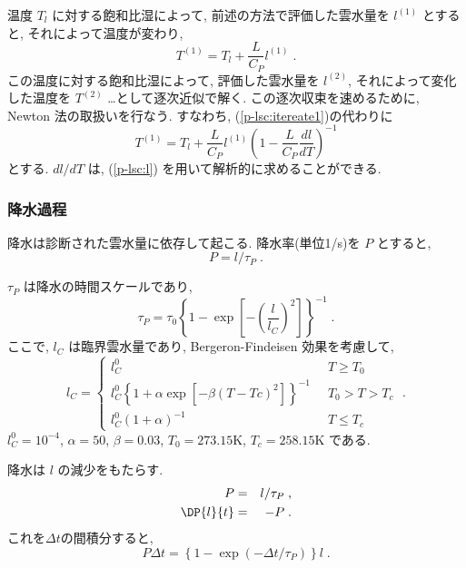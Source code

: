温度 $T_l$ に対する飽和比湿によって, 
前述の方法で評価した雲水量を $l^{(1)}$ とすると,
それによって温度が変わり,
\begin{equation}
  T^{(1)} = T_l +  \frac{L}{C_P} l^{(1)} \; .
  \label{p-lsc:itereate1}
\end{equation}
この温度に対する飽和比湿によって, 評価した雲水量を $l^{(2)}$,
それによって変化した温度を $T^{(2)}$ \ldots として逐次近似で解く.
この逐次収束を速めるために, Newton 法の取扱いを行なう.
すなわち, (\ref{p-lsc:itereate1})の代わりに
\begin{equation}
  T^{(1)} = T_l +  \frac{L}{C_P} l^{(1)} 
                   \left( 1 - \frac{L}{C_P} \frac{dl}{dT} \right)^{-1}
\end{equation}
とする.
$dl/dT$ は, (\ref{p-lsc:l}) を用いて解析的に求めることができる.

\subsubsection{降水過程}

降水は診断された雲水量に依存して起こる.
降水率(単位1/s)を $P$ とすると,
\begin{equation}
  P = l / \tau_P \; .
\end{equation}

$\tau_P$ は降水の時間スケールであり,
\begin{equation}
  \tau_P  = \tau_0 \left\{ 1 - \exp\left[ - \left(\frac{l}{l_C}\right)^2  
                                   \right]  \right\}^{-1} \; .
\end{equation}
ここで, $l_C$ は臨界雲水量であり,
Bergeron-Findeisen 効果を考慮して,
\begin{equation}
  l_C = \left\{ 
        \begin{array}{ll}
          l_C^0 \; \; & T \ge T_0 \\
          l_C^0 \left\{ 1+\alpha \exp\left[ - \beta(T-Tc)^2 \right] 
                \right\}^{-1}\; \; 
                      & T_0 > T >  T_c \\
          l_C^0 ( 1+\alpha )^{-1}
                      & T \le T_c
        \end{array}
        \right. \; .
\end{equation}
$l_C^0=10^{-4}$, $\alpha=50$, $\beta=0.03$, 
$T_0=273.15$K, $T_c=258.15$K である.

降水は $l$ の減少をもたらす.
\begin{eqnarray}
  P         & = & l / \tau_P \; , \\
  \DP{l}{t} & = & -P \; .
\end{eqnarray}
これを$\Delta t$の間積分すると,
\begin{equation}
  P \Delta t  =  \left\{ 1- \exp(- \Delta t/\tau_P) \right\} l \; .
\end{equation}

